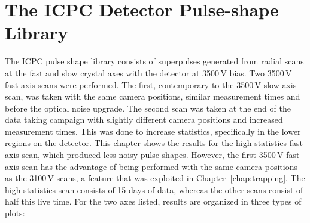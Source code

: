 \chapter{The ICPC Detector Pulse-shape Library}\label{chap:library}

The ICPC pulse shape library consists of superpulses generated from radial scans at the fast and slow crystal axes with the detector at 3500\,V bias. Two 3500\,V fast axis scans were performed. The first, contemporary to the 3500\,V slow axis scan, was taken with the same camera positions, similar measurement times and before the optical noise upgrade. The second scan was taken at the end of the data taking campaign with slightly different camera positions and increased measurement times. This was done to increase statistics, specifically in the lower regions on the detector. This chapter shows the results for the high-statistics fast axis scan, which produced less noisy pulse shapes. However, the first 3500\,V fast axis scan has the advantage of being performed with the same camera positions as the 3100\,V scans, a feature that was exploited in Chapter~\ref{chap:trapping}. The high-statistics scan consists of 15 days of data, whereas the other scans consist of half this live time. For the two axes listed, results are organized in three types of plots:
